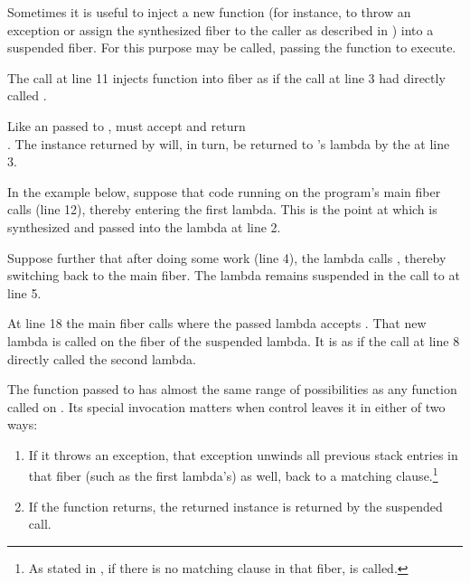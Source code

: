 \label{resumewith}
Sometimes it is useful to inject a new function (for instance, to throw an
exception or assign the synthesized fiber to the caller as described in
) into a suspended fiber. For this purpose
\anyresumewith may be called, passing the function  to execute.


The \resumewith call at line 11 injects function  into
fiber  as if the \resume call at line 3 had directly
called .

Like an \entryfn passed to \fiber,  must accept
 and return\\
\fiber. The \fiber instance returned by  will, in turn, be returned
to 's lambda by the \resume at line 3.

In the example below, suppose that code running on the program's main fiber
calls \resume (line 12), thereby entering the first lambda. This is the point
at which  is synthesized and passed into the lambda at line 2.

Suppose further that after doing some work (line 4), the lambda calls
, thereby switching back to the main fiber. The lambda remains
suspended in the call to  at line 5.

At line 18 the main fiber calls  where the passed lambda
accepts . That new lambda is called on the fiber of the suspended
lambda. It is as if the  call at line 8 directly called the second
lambda.

The function passed to \resumewith has almost the same range of possibilities as
any function called on . Its special invocation
matters when control leaves it in either of two ways:

\begin{enumerate}
  \item If it throws an exception, that exception unwinds all previous stack
        entries in that fiber (such as the first lambda's) as well, back to
        a matching  clause.\footnote{As stated
        in , if there is no matching 
        clause in that fiber,  is called.}
  \item If the function returns, the returned \fiber instance is returned by
        the suspended \anyresume call.
\end{enumerate}

